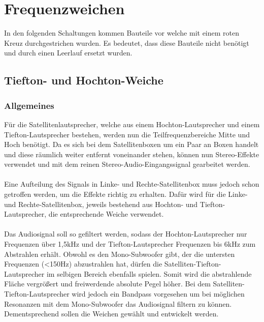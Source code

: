 


\newpage
\section{Frequenzweichen}
In den folgenden Schaltungen kommen Bauteile vor welche mit einem roten Kreuz durchgestrichen wurden.
Es bedeutet, dass diese Bauteile nicht benötigt und durch einen Leerlauf ersetzt wurden.
\subsection*{Tiefton- und Hochton-Weiche}\label{sec:5.4}
\subsubsection{Allgemeines}\label{subsec:5.4.1}
Für die Satellitenlautsprecher, welche aus einem Hochton-Lautsprecher und einem Tiefton-Lautsprecher bestehen, werden nun die Teilfrequenzbereiche Mitte und Hoch benötigt.
Da es sich bei dem Satellitenboxen um ein Paar an Boxen handelt und diese räumlich weiter entfernt voneinander stehen, können nun Stereo-Effekte verwendet und mit dem reinen Stereo-Audio-Eingangssignal gearbeitet werden.
\\ \\
Eine Aufteilung des Signals in Linke- und Rechte-Satellitenbox muss jedoch schon getroffen werden, um die Effekte richtig zu erhalten.
Dafür wird für die Linke- und Rechte-Satellitenbox, jeweils bestehend aus Hochton- und Tiefton-Lautsprecher, die entsprechende Weiche verwendet.
\\ \\
Das Audiosignal soll so gefiltert werden, sodass der Hochton-Lautsprecher nur Frequenzen über 1,5kHz und der Tiefton-Lautsprecher Frequenzen bis 6kHz zum Abstrahlen erhält.
Obwohl es den Mono-Subwoofer gibt, der die untersten Frequenzen (<150Hz) abzustrahlen hat, dürfen die Satelliten-Tiefton-Lautsprecher im selbigen Bereich ebenfalls spielen.
Somit wird die abstrahlende Fläche vergrößert und freiwerdende absolute Pegel höher.
Bei dem Satelliten-Tiefton-Lautsprecher wird jedoch ein Bandpass vorgesehen um bei möglichen Resonanzen mit dem Mono-Subwoofer das Audiosignal filtern zu können.
\\
Dementsprechend sollen die Weichen gewählt und entwickelt werden.
\\

